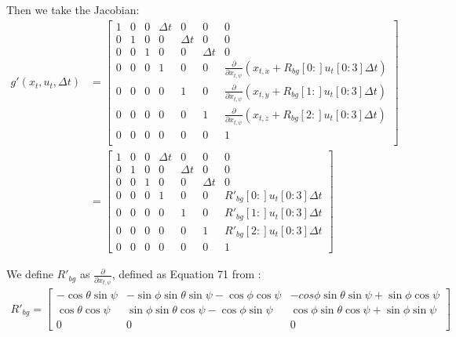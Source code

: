 \documentclass{article}
\begin{document}
Then we take the Jacobian:
\begin{align}
  g'(x_t, u_t, \Delta t) &= \left [ \begin{array}{ccccccc}
      1 & 0 & 0 & \Delta t & 0 & 0 & 0\\
      0 & 1 & 0 & 0 & \Delta t & 0 & 0\\
      0 & 0 & 1 & 0 & 0 & \Delta t & 0\\
      0 & 0 & 0 & 1 & 0 & 0 & \frac{\partial}{\partial x_{t,\psi}} \left(x_{t,\dot{x}} + R_{bg}[0:]u_t[0:3] \Delta t\right)\\
      0 & 0 & 0 & 0 & 1  & 0 & \frac{\partial}{\partial x_{t,\psi}} \left(x_{t, \dot{y}} + R_{bg}[1:]u_t[0:3] \Delta t\right)\\
      0 & 0 & 0 & 0 & 0 & 1 & \frac{\partial}{\partial x_{t,\psi}} \left(x_{t, \dot{z}} + R_{bg}[2:]u_t[0:3] \Delta t\right)\\
      0 & 0 & 0 & 0 & 0 & 0 & 1\\ 
    \end{array}
    \right]\\
&= \left [ \begin{array}{ccccccc}
      1 & 0 & 0 & \Delta t & 0 & 0 & 0\\
      0 & 1 & 0 & 0 & \Delta t & 0 & 0\\
      0 & 0 & 1 & 0 & 0 & \Delta t & 0\\
      0 & 0 & 0 & 1 & 0 & 0 & R'_{bg}[0:]u_t[0:3] \Delta t\\
      0 & 0 & 0 & 0 & 1  & 0 & R'_{bg}[1:]u_t[0:3] \Delta t\\
      0 & 0 & 0 & 0 & 0 & 1 &  R'_{bg}[2:]u_t[0:3] \Delta t\\
      0 & 0 & 0 & 0 & 0 & 0 & 1
    \end{array}
    \right]
\end{align}

We define $R'_{bg}$ as $\frac{\partial}{\partial x_{t,\psi}}$, defined
  as Equation 71 from \citet{diebel2006representing}:
\begin{align}
R'_{bg} = \left[
  \begin{array}{ccc}
    -\cos \theta \sin \psi&
    -\sin\phi \sin \theta \sin \psi - \cos \phi \cos \psi&
    -cos \phi \sin \theta \sin \psi + \sin \phi \cos \psi\\
    \cos \theta \cos \psi&
    \sin \phi \sin \theta \cos \psi - \cos \phi \sin \psi&
    \cos \phi \sin \theta \cos \psi + \sin \phi \sin \psi\\
    0&0&0
  \end{array}
  \right]
\end{align}
\end{document}
